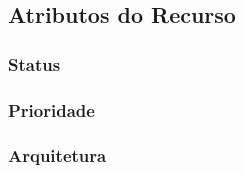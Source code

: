 
\subsection{Atributos do Recurso}

\subsubsection{Status}

\subsubsection{Prioridade}

\subsubsection{Arquitetura}